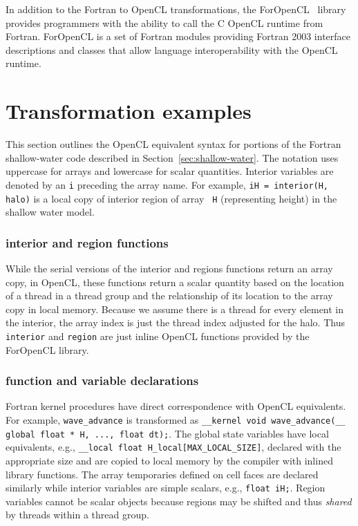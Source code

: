 In addition to the Fortran to OpenCL transformations, the
ForOpenCL~\cite{ofp:sf} library provides programmers with the ability to
call the C OpenCL runtime from Fortran.  ForOpenCL is a set of Fortran modules
providing Fortran 2003 interface descriptions and classes that allow language
interoperability with the OpenCL runtime.


\section{Transformation examples}

This section outlines the OpenCL equivalent syntax for portions of
the Fortran shallow-water code described in
Section~\ref{sec:shallow-water}.  The notation uses uppercase for
arrays and lowercase for scalar quantities.  Interior variables are
denoted by an {\tt i} preceding the array name.  For example, {\tt iH =
  interior(H, halo)} is a local copy of interior region of array {\tt
  H} (representing height) in the shallow water model.

\subsubsection{interior and region functions}

While the serial versions of the interior and regions functions return an
array copy, in OpenCL, these functions return a scalar quantity based on the
location of a thread in a thread group and the relationship of its location to
the array copy in local memory.  Because we assume there is a thread for every
element in the interior, the array index is just the thread index adjusted for
the halo.  Thus {\tt interior} and {\tt region} are just inline OpenCL
functions provided by the ForOpenCL library.

\subsubsection{function and variable declarations}

Fortran kernel procedures have direct correspondence with OpenCL equivalents.
For example, {\tt wave\_advance} is transformed as {\tt \_\_kernel void
  wave\_advance(\_\_ global float * H, ..., float dt);}.  The global state
variables have local equivalents, e.g., {\tt \_\_local float
  H\_local[MAX\_LOCAL\_SIZE]}, declared with the appropriate size and are
copied to local memory by the compiler with inlined library functions.  The
array temporaries defined on cell faces are declared similarly while interior
variables are simple scalars, e.g., {\tt float iH;}.  Region variables cannot
be scalar objects because regions may be shifted and thus \emph{shared} by
threads within a thread group.

